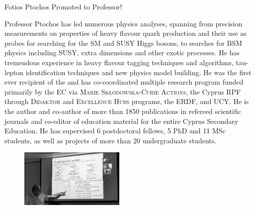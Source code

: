 \begin{headline}[enhanced, tikz={rotate=0}, width=0.48\textwidth]{Fotios Ptochos Promoted to Professor!}
\begin{multicols}{2}
    Professor Ptochos has led numerous physics analyses, spanning
    from precision measurements on properties of heavy flavour quark
    production and their use as probes for searching for the SM and SUSY
    Higgs bosons, to searches for BSM physics including SUSY, extra
    dimensions and other exotic processes. He has tremendous experience in
    heavy flavour tagging techniques and algorithms, tau-lepton
    identification techniques and new physics model building. 
    He was the first ever recipient of the  and has co-coordinated multiple research program
    funded primarily by the EC via \textsc{Marie
    Skłodowska-Curie Actions}, the Cyprus RPF through
    \textsc{Didaktor} and \textsc{Excellence Hubs} programs, the ERDF,
    and UCY. He is the author and co-author of more than 
    1850 publications in refereed scientific journals and co-editor of
    education material for the entire Cyprus Secondary Education. He has
    supervised 6 postdoctoral fellows, 5
    PhD and 11 MSc students, as well as projects of more than 20
    undergraduate students.  
    \begin{figure}
      \begin{center}
        \leavevmode
        \includegraphics[width=0.45\textwidth]{./figures/Fotis7.png}
      \end{center}
    \end{figure}
\end{multicols}
\end{headline}

